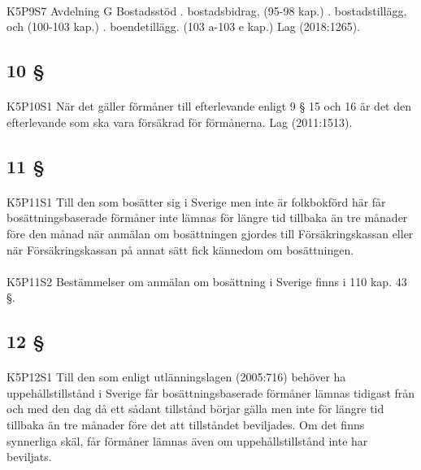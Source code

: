 \documentclass[a4paper,notitlepage,openany,10pt]{book}
\begin{document}
\paragraph*{}
{\tiny K5P9S7}
Avdelning G Bostadsstöd
. bostadsbidrag, (95-98 kap.)
. bostadstillägg, och (100-103 kap.)
. boendetillägg. (103 a-103 e kap.)
Lag (2018:1265).
\subsection*{10 §}
\paragraph*{}
{\tiny K5P10S1}
När det gäller förmåner till efterlevande enligt 9 § 15 och 16 är det den efterlevande som ska vara försäkrad för förmånerna.
Lag (2011:1513).
\subsection*{11 §}
\paragraph*{}
{\tiny K5P11S1}
Till den som bosätter sig i Sverige men inte är folkbokförd här får bosättningsbaserade förmåner inte lämnas för längre tid tillbaka än tre månader före den månad när anmälan om bosättningen gjordes till Försäkringskassan eller när Försäkringskassan på annat sätt fick kännedom om bosättningen.
\paragraph*{}
{\tiny K5P11S2}
Bestämmelser om anmälan om bosättning i Sverige finns i 110 kap. 43 §.
\subsection*{12 §}
\paragraph*{}
{\tiny K5P12S1}
Till den som enligt utlänningslagen (2005:716) behöver ha uppehållstillstånd i Sverige får bosättningsbaserade förmåner lämnas tidigast från och med den dag då ett sådant tillstånd börjar gälla men inte för längre tid tillbaka än tre månader före det att tillståndet beviljades. Om det finns synnerliga skäl, får förmåner lämnas även om uppehållstillstånd inte har beviljats.
\end{document}
